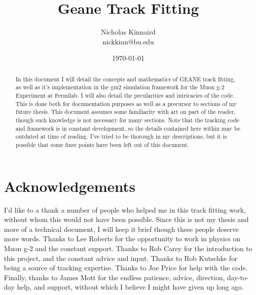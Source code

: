\documentclass{article}
\begin{document}
\title{Geane Track Fitting}
\author{Nicholas Kinnaird \\ nickkinn@bu.edu}
\date{\today}
\maketitle

\begin{abstract}

    In this document I will detail the concepts and mathematics of GEANE track fitting, as well as it's implementation in the gm2 simulation framework for the Muon g-2 Experiment at Fermilab. I will also detail the pecularities and intricacies of the code. This is done both for documentation purposes as well as a precursor to sections of my future thesis. This document assumes some familiarity with art on part of the reader, though such knowledge is not necessary for many sections. Note that the tracking code and framework is in constant development, so the details contained here within may be outdated at time of reading. I've tried to be thorough in my descriptions, but it is possible that some finer points have been left out of this document.

\end{abstract}

\tableofcontents













% 







\printbibliography

\section*{Acknowledgements}

	I'd like to a thank a number of people who helped me in this track fitting work, without whom this would not have been possible. Since this is not my thesis and more of a technical document, I will keep it brief though these people deserve more words. Thanks to Lee Roberts for the opportunity to work in physics on Muon g-2 and the constant support. Thanks to Rob Carey for the introduction to this project, and the constant advice and input. Thanks to Rob Kutschke for being a source of tracking expertise. Thanks to Joe Price for help with the code. Finally, thanks to James Mott for the endless patience, advice, direction, day-to-day help, and support, without which I believe I might have given up long ago.
	
\end{document}
